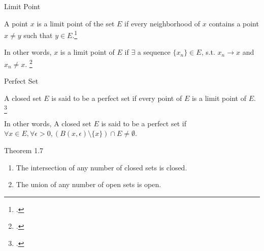 \documentclass[UTF8,a4paper,10pt]{article}
\begin{document}
  \begin{mybox}{Limit Point}

 
    A point \(x\) is a limit point of the set \(E\) if every neighborhood of \(x\)
contains a point \(x\neq y\) such that \(y\in E\).\footcite[][32]{rudin1976principles}  


In other words, \(x\) is a limit point of \(E\) if \(\exists\) a sequence \(\{x_n\}\in E\), s.t. \(x_n\to x\) and \(x_n\neq x\).    \footcite[][3-4]{Wheeden_Zygmund_2015} 
  \end{mybox}

  \begin{mybox}{Perfect Set}


    A closed set \(E\) is said to be a perfect set if every point of \(E\) is a limit point of \(E\).    \footcite[][7]{Wheeden_Zygmund_2015}

    In other words, A closed set \(E\) is said to be a perfect set if \(\forall x\in E, \forall \epsilon>0, (B(x,\epsilon)\setminus \{x\})\cap E\neq \emptyset \).

  \end{mybox}


  \begin{mybox}{Theorem 1.7}
    \begin{enumerate}[label=(\roman*)]
      \item The intersection of any number of closed sets is closed.
      \item The union of any number of open sets is open.
    \end{enumerate}
  \end{mybox}
\end{document}

